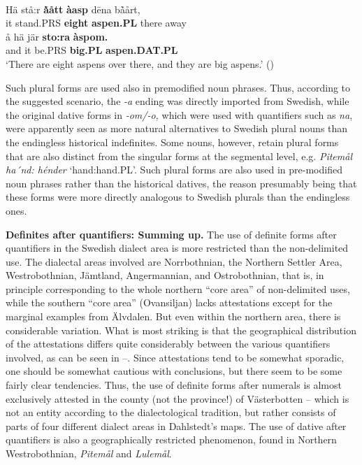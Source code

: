 \ea \label{} 
\\
\gll Hä  stå:r  \textbf{\`{å}ått} \textbf{àasp} d\=ena  b\`{å}årt,\\
it  stand.PRS  \textbf{eight} \textbf{aspen.PL} there  away\\
\gll å  hä  jär  \textbf{sto:ra} \textbf{àspom.}\\
and  it  be.PRS  \textbf{big.PL} \textbf{aspen.DAT.PL}\\
\glt ‘There are eight aspens over there, and they are big aspens.’ (\citet[20]{LidströmEtAl1991}) 

\z

Such plural forms are used also in premodified noun phrases. Thus, according to the suggested scenario, the\textit{ {}-a} ending was directly imported from Swedish, while the original dative forms in\textit{ {}-om/-o,} which were used with quantifiers such as \textit{na},\textit{ }were apparently seen as more natural alternatives to Swedish plural nouns than the endingless historical indefinites. Some nouns, however, retain plural forms that are also distinct from the singular forms at the segmental level, e.g. \textit{Pitemål} \textit{ha´nd: hénder} ‘hand:hand.PL’.  Such plural forms are also used in pre-modified noun phrases rather than the historical datives, the reason presumably being that these forms were more directly analogous to Swedish plurals than the endingless ones. 

\textbf{Definites after quantifiers: Summing up. }The use of definite forms after quantifiers in the Swedish dialect area is more restricted than the non-delimited use. The dialectal areas involved are Norrbothnian, the Northern Settler Area, Westrobothnian, Jämtland, Angermannian, and Ostrobothnian, that is, in principle corresponding to the whole northern “core area” of non-delimited uses, while the southern “core area” (Ovansiljan) lacks attestations except for the marginal examples from Älvdalen. But even within the northern area, there is considerable variation. What is most striking is that the geographical distribution of the attestations differs quite considerably between the various quantifiers involved, as can be seen in --. Since attestations tend to be somewhat sporadic, one should be somewhat cautious with conclusions, but there seem to be some fairly clear tendencies. Thus, the use of definite forms after numerals is almost exclusively attested in the county (not the province!) of Västerbotten – which is not an entity according to the dialectological tradition, but rather consists of parts of four different dialect areas in Dahlstedt’s maps. The use of dative after quantifiers is also a geographically restricted phenomenon, found in Northern Westrobothnian, \textit{Pitemål} and \textit{Lulemål}. 

